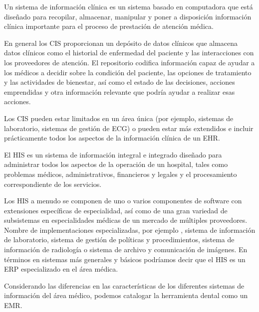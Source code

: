 \vspace{1em}

Un sistema de información clínica es un sistema basado en computadora que está diseñado para recopilar, almacenar, manipular y poner a disposición información clínica importante para el proceso de prestación de atención médica.

\vspace{1em}

En general los CIS proporcionan un depósito de datos clínicos que almacena datos clínicos como el historial de enfermedad del paciente y las interacciones con los proveedores de atención. El repositorio codifica información capaz de ayudar a los médicos a decidir sobre la condición del paciente, las opciones de tratamiento y las actividades de bienestar, así como el estado de las decisiones, acciones emprendidas y otra información relevante que podría ayudar a realizar esas acciones.

\vspace{1em}

Los CIS pueden estar limitados en un área única (por ejemplo, sistemas de laboratorio, sistemas de gestión de ECG) o pueden estar más extendidos e incluir prácticamente todos los aspectos de la información clínica de un EHR.

\vspace{1em}

El HIS es un sistema de información integral e integrado diseñado para administrar todos los aspectos de la operación de un hospital, tales como problemas médicos, administrativos, financieros y legales y el procesamiento correspondiente de los servicios. 

\vspace{1em}

Los HIS a menudo se componen de uno o varios componentes de software con extensiones específicas de especialidad, así como de una gran variedad de subsistemas en especialidades médicas de un mercado de múltiples proveedores. Nombre de implementaciones especializadas, por ejemplo , sistema de información de laboratorio, sistema de gestión de políticas y procedimientos, sistema de información de radiología o sistema de archivo y comunicación de imágenes. En términos en sistemas más generales y básicos podríamos decir que el HIS es un ERP especializado en el área médica.

\vspace{1em}

Considerando las diferencias en las características de los diferentes sistemas de información del área médico, podemos catalogar la herramienta dental como un EMR.

